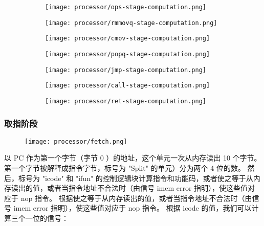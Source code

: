 \begin{figure}[H]
    \centering
    \begin{subfigure}[t]{0.5\textwidth}
        \centering
        \texttt{[image: processor/ops-stage-computation.png]}
    \end{subfigure}\hfill
    \begin{subfigure}[t]{0.5\textwidth}
        \centering
        \texttt{[image: processor/rmmovq-stage-computation.png]}
    \end{subfigure}
    \medskip
    \begin{subfigure}[t]{0.5\textwidth}
        \centering
        \texttt{[image: processor/cmov-stage-computation.png]}
    \end{subfigure}\hfill
    \begin{subfigure}[t]{0.5\textwidth}
        \centering
        \texttt{[image: processor/popq-stage-computation.png]}
    \end{subfigure}
    \medskip
    \begin{subfigure}[t]{0.5\textwidth}
        \centering
        \texttt{[image: processor/jmp-stage-computation.png]}
    \end{subfigure}\hfill
    \begin{subfigure}[t]{0.5\textwidth}
        \centering
        \texttt{[image: processor/call-stage-computation.png]}
    \end{subfigure}
    \medskip
    \begin{subfigure}[t]{0.5\textwidth}
        \centering
        \texttt{[image: processor/ret-stage-computation.png]}
    \end{subfigure}
\end{figure}

\subsubsection{取指阶段}

\begin{figure}[H]
    \centering
    \texttt{[image: processor/fetch.png]}
\end{figure}

以 PC 作为第一个字节（字节 0 ）的地址，这个单元一次从内存读出 10 个字节。
第一个字节被解释成指令字节，标号为 "Split" 的单元）分为两个 4 位的数。
然后，标号为 "icode" 和 "ifun" 的控制逻辑块计算指令和功能码，或者使之等于从内存读出的值，或者当指令地址不合法时（由信号 imem error 指明），使这些值对应于 nop 指令。
根据使之等于从内存读出的值，或者当指令地址不合法时（由信号 imem error 指明），使这些值对应于 nop 指令。
根据 icode 的值，我们可以计算三个一位的信号：

